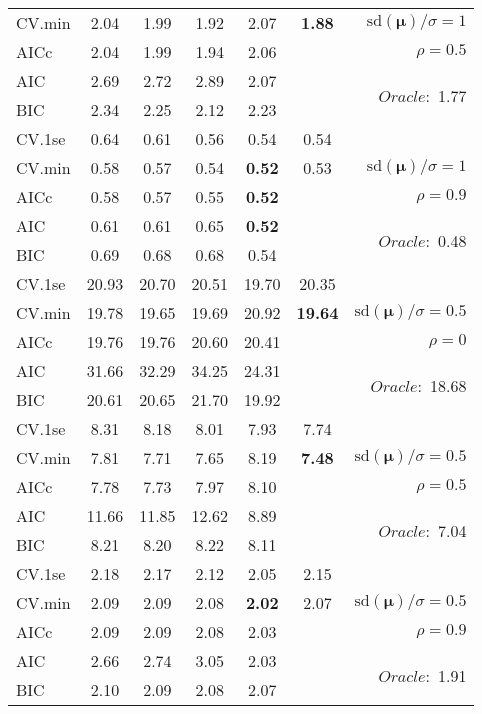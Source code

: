 \begin{table}
\begin{center}
\begin{tabular}{l*{5}{c}|r}
CV.min & 2.04 & 1.99 & 1.92 & 2.07 & {\bf 1.88} &  $\mathrm{sd}(\mathbf{\mu})/\sigma=1$ \\
AICc & 2.04 & 1.99 & 1.94 & 2.06 & & $\rho=0.5$ \\
AIC & 2.69 & 2.72 & 2.89 & 2.07 & &  \multirow{2}{*}{$Oracle: $ 1.77} \\
BIC & 2.34 & 2.25 & 2.12 & 2.23 & &  \\
 \hline 
CV.1se & 0.64 & 0.61 & 0.56 & 0.54 & 0.54 & \\
CV.min & 0.58 & 0.57 & 0.54 & {\bf 0.52} & 0.53 &  $\mathrm{sd}(\mathbf{\mu})/\sigma=1$ \\
AICc & 0.58 & 0.57 & 0.55 & {\bf 0.52} & & $\rho=0.9$ \\
AIC & 0.61 & 0.61 & 0.65 & {\bf 0.52} & &  \multirow{2}{*}{$Oracle: $ 0.48} \\
BIC & 0.69 & 0.68 & 0.68 & 0.54 & &  \\
 \hline 
CV.1se & 20.93 & 20.70 & 20.51 & 19.70 & 20.35 & \\
CV.min & 19.78 & 19.65 & 19.69 & 20.92 & {\bf 19.64} &  $\mathrm{sd}(\mathbf{\mu})/\sigma=0.5$ \\
AICc & 19.76 & 19.76 & 20.60 & 20.41 & & $\rho=0$ \\
AIC & 31.66 & 32.29 & 34.25 & 24.31 & &  \multirow{2}{*}{$Oracle: $ 18.68} \\
BIC & 20.61 & 20.65 & 21.70 & 19.92 & &  \\
 \hline 
CV.1se & 8.31 & 8.18 & 8.01 & 7.93 & 7.74 & \\
CV.min & 7.81 & 7.71 & 7.65 & 8.19 & {\bf 7.48} &  $\mathrm{sd}(\mathbf{\mu})/\sigma=0.5$ \\
AICc & 7.78 & 7.73 & 7.97 & 8.10 & & $\rho=0.5$ \\
AIC & 11.66 & 11.85 & 12.62 & 8.89 & &  \multirow{2}{*}{$Oracle: $ 7.04} \\
BIC & 8.21 & 8.20 & 8.22 & 8.11 & &  \\
 \hline 
CV.1se & 2.18 & 2.17 & 2.12 & 2.05 & 2.15 & \\
CV.min & 2.09 & 2.09 & 2.08 & {\bf 2.02} & 2.07 &  $\mathrm{sd}(\mathbf{\mu})/\sigma=0.5$ \\
AICc & 2.09 & 2.09 & 2.08 & 2.03 & & $\rho=0.9$ \\
AIC & 2.66 & 2.74 & 3.05 & 2.03 & &  \multirow{2}{*}{$Oracle: $ 1.91} \\
BIC & 2.10 & 2.09 & 2.08 & 2.07 & &  \\
 \hline 
\end{tabular}
\end{center}
\vspace{-1cm}
\end{table}




